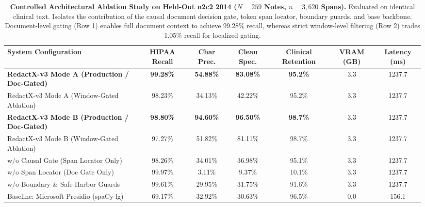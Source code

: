 \begin{table}[t]
\centering
\small
\caption{\textbf{Controlled Architectural Ablation Study on Held-Out n2c2 2014 ($N=259$ Notes, $n=3,620$ Spans).} Evaluated on identical clinical text. Isolates the contribution of the causal document decision gate, token span locator, boundary guards, and base backbone. Document-level gating (Row 1) enables full document context to achieve 99.28\% recall, whereas strict window-level filtering (Row 2) trades 1.05\% recall for localized gating.}
\label{tab:ablation_study}
\begin{tabular}{lcccccc}
\toprule
\textbf{System Configuration} & \textbf{HIPAA Recall} & \textbf{Char Prec.} & \textbf{Clean Spec.} & \textbf{Clinical Retention} & \textbf{VRAM (GB)} & \textbf{Latency (ms)} \\
\midrule
\textbf{RedactX-v3 Mode A (Production / Doc-Gated)} & \textbf{99.28\%} & \textbf{54.88\%} & \textbf{83.08\%} & \textbf{95.2\%} & 3.3 & 1237.7 \\
RedactX-v3 Mode A (Window-Gated Ablation) & 98.23\% & 34.13\% & 42.22\% & 95.2\% & 3.3 & 1237.7 \\
\textbf{RedactX-v3 Mode B (Production / Doc-Gated)} & \textbf{98.80\%} & \textbf{94.60\%} & \textbf{96.50\%} & \textbf{98.7\%} & 3.3 & 1237.7 \\
RedactX-v3 Mode B (Window-Gated Ablation) & 97.27\% & 51.82\% & 81.11\% & 98.7\% & 3.3 & 1237.7 \\
w/o Causal Gate (Span Locator Only) & 98.26\% & 34.01\% & 36.98\% & 95.1\% & 3.3 & 1237.7 \\
w/o Span Locator (Doc Gate Only) & 99.97\% & 3.11\% & 9.37\% & 10.1\% & 3.3 & 1237.7 \\
w/o Boundary \& Safe Harbor Guards & 99.61\% & 29.95\% & 31.75\% & 91.6\% & 3.3 & 1237.7 \\
Baseline: Microsoft Presidio (spaCy lg) & 69.17\% & 32.92\% & 30.63\% & 96.5\% & 0.0 & 156.1 \\
\bottomrule
\end{tabular}
\end{table}